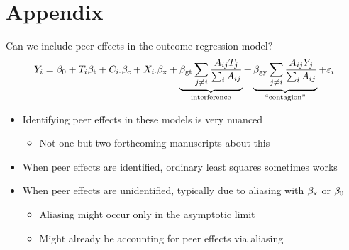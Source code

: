 \documentclass[aspectratio=169]{beamer}
\theoremstyle{remark}
\begin{document}
\section{Appendix}
\appendix


\begin{frame}{Can we include peer effects in the outcome regression model?}
    \begin{equation*}
        \begin{aligned}
            Y_i
            = \beta_0 + T_i \beta_\text{t} + C_{i \cdot} \beta_\text{c} + X_{i \cdot} \beta_\text{x} +
            \underbrace{\beta_\text{gt} \sum_{j \neq i} \frac{A_{ij} T_j}{\sum_i A_{ij}}}_\text{interference} +
            \underbrace{\beta_\text{gy} \sum_{j \neq i} \frac{A_{ij} Y_j}{\sum_i A_{ij}}}_\text{``contagion''} +
            \varepsilon_i
        \end{aligned}
    \end{equation*}
    \begin{itemize}
        \item Identifying peer effects in these models is very nuanced
              \begin{itemize}
                  \item Not one but two forthcoming manuscripts about this
              \end{itemize}
        \item When peer effects are identified, ordinary least squares sometimes works
        \item When peer effects are unidentified, typically due to aliasing with $\beta_\text{x}$ or $\beta_0$
              \begin{itemize}
                  \item Aliasing might occur only in the asymptotic limit
                  \item Might already be accounting for peer effects via aliasing
              \end{itemize}
    \end{itemize}
\end{frame}
\end{document}

